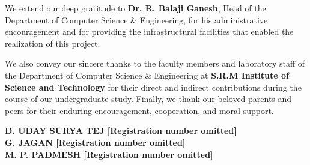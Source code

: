 \documentclass[BTech]{srmuthesis}
\begin{document}
We extend our deep gratitude to \textbf{Dr. R. Balaji Ganesh}, Head of the Department of Computer Science \& Engineering, for his administrative encouragement and for providing the infrastructural facilities that enabled the realization of this project.

We also convey our sincere thanks to the faculty members and laboratory staff of the Department of Computer Science \& Engineering at \textbf{S.R.M Institute of Science and Technology} for their direct and indirect contributions during the course of our undergraduate study. Finally, we thank our beloved parents and peers for their enduring encouragement, cooperation, and moral support.

\begin{flushright}
{\bf D. UDAY SURYA TEJ [Registration number omitted]}\\
{\bf G. JAGAN [Registration number omitted]}\\
{\bf M. P. PADMESH [Registration number omitted]}
\end{flushright}


\begin{singlespace}
\tableofcontents
\thispagestyle{empty}

\listoftables
{}
\listoffigures
{}
\end{singlespace}

\abbreviations
\begin{acronym}
\end{acronym}
\end{document}
